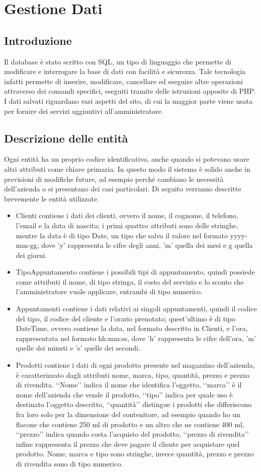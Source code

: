 \section{Gestione Dati}{
	\subsection{Introduzione}{
		Il database è stato scritto con SQL, un tipo di linguaggio che permette di modificare e interrogare la base di dati con facilità e sicurezza. Tale tecnologia infatti permette di inserire, modificare, cancellare ed eseguire altre operazioni attraverso dei comandi specifici, eseguiti tramite delle istruzioni apposite di PHP. I dati salvati riguardano vari aspetti del sito, di cui la maggior parte viene usata per fornire dei servizi aggiuntivi all'amministratore.
	}
	\subsection{Descrizione delle entità}{
		Ogni entità ha un proprio codice identificativo, anche quando si potevano usare altri attributi come chiave primaria. In questo modo il sistema è solido anche in previsioni di modifiche future, ad esempio perché cambiano le necessità dell'azienda o si presentano dei casi particolari. Di seguito verranno descritte brevemente le entità utilizzate.
		\begin{itemize}
			\item Clienti contiene i dati dei clienti, ovvero il nome, il cognome, il telefono, l'email e la data di nascita; i primi quattro attributi sono delle stringhe, mentre la data è di tipo Date, un tipo che salva il valore nel formato yyyy-mm-gg, dove 'y' rappresenta le cifre degli anni, 'm' quella dei mesi e g quella dei giorni.
			\item TipoAppuntamento contiene i possibili tipi di appuntamento, quindi possiede come attributi il nome, di tipo stringa, il costo del servizio e lo sconto che l'amministratore vuole applicare, entrambi di tipo numerico.
			\item Appuntamenti contiene i dati relativi ai singoli appuntamenti, quindi il codice del tipo, il codice del cliente e l'orario prenotato; quest'ultimo è di tipo DateTime, ovvero contiene la data, nel formato descritto in Clienti, e l'ora, rappresentata nel formato hh:mm:ss, dove 'h' rappresenta le cifre dell'ora, 'm' quelle dei minuti e 's' quelle dei secondi.
			\item Prodotti contiene i dati di ogni prodotto presente nel magazzino dell'azienda, è caratterizzato dagli attributi nome, marca, tipo, quantità, prezzo e prezzo di rivendita. ‘‘Nome’’ indica il nome che identifica l'oggetto, ‘‘marca’’ è il nome dell'azienda che vende il prodotto, ‘‘tipo’’ indica per quale uso è destinato l'oggetto descritto, ‘‘quantità’’ distingue i prodotti che differiscono fra loro solo per la dimensione del contenitore, ad esempio quando ho un flacone che contiene 250 ml di prodotto e un altro che ne contiene 400 ml, ‘‘prezzo’’ indica quando costa l'acquisto del prodotto, ‘‘prezzo di rivendita’’ infine rappresenta il prezzo che deve pagare il cliente per acquistare quel prodotto. Nome, marca e tipo sono stringhe, invece quantità, prezzo e prezzo di rivendita sono di tipo numerico. 

\end{itemize}}}
